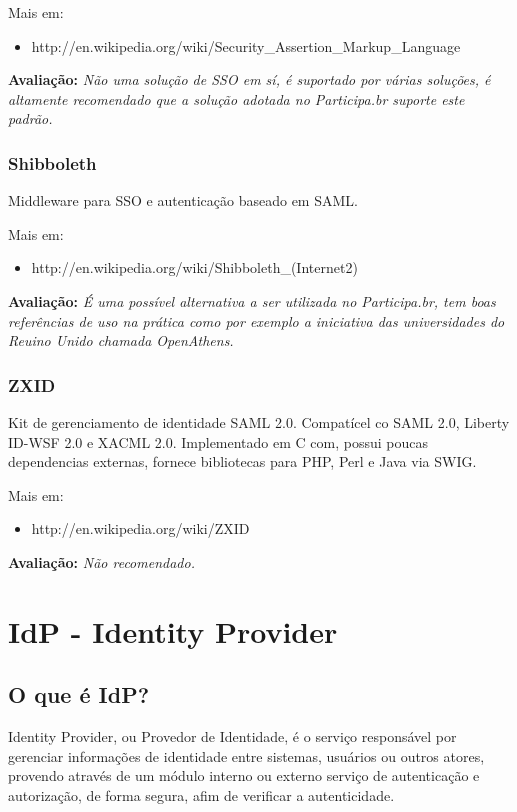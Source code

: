 \documentclass[11pt]{article}
\begin{document}
Mais em:
\begin{itemize}
  \item{http://en.wikipedia.org/wiki/Security\_Assertion\_Markup\_Language}
\end{itemize}

{\bf Avaliação:} {\it Não uma solução de SSO em sí, é suportado por várias
soluções, é altamente recomendado que a solução adotada no Participa.br
suporte este padrão.}

\subsubsection{Shibboleth}

Middleware para SSO e autenticação baseado em SAML.

Mais em:
\begin{itemize}
  \item{http://en.wikipedia.org/wiki/Shibboleth\_(Internet2)}
\end{itemize}

{\bf Avaliação:} {\it É uma possível alternativa a ser utilizada no
Participa.br, tem boas referências de uso na prática como por exemplo a
iniciativa das universidades do Reuino Unido chamada OpenAthens.}

\subsubsection{ZXID}

Kit de gerenciamento de identidade SAML 2.0. Compatícel co SAML 2.0, Liberty
ID-WSF 2.0 e XACML 2.0. Implementado em C com, possui poucas dependencias
externas, fornece bibliotecas para PHP, Perl e Java via SWIG.

Mais em:
\begin{itemize}
  \item{http://en.wikipedia.org/wiki/ZXID}
\end{itemize}

{\bf Avaliação:} {\it Não recomendado.}

\section{IdP - Identity Provider}

\subsection{O que é IdP?}

Identity Provider, ou Provedor de Identidade, é o serviço responsável por
gerenciar informações de identidade entre sistemas, usuários ou outros atores,
provendo através de um módulo interno ou externo serviço de autenticação e
autorização, de forma segura, afim de verificar a autenticidade.
\end{document}
